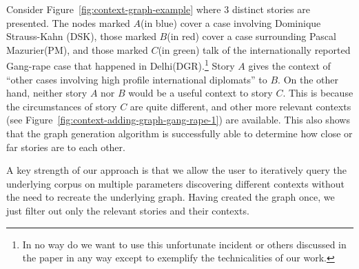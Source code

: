 Consider Figure~\ref{fig:context-graph-example} where 3 distinct stories are presented. The nodes marked $A$(in blue) cover a case involving Dominique Strauss-Kahn (DSK), 
those marked $B$(in red) cover a case surrounding Pascal Mazurier(PM), and those marked $C$(in green) talk of the internationally reported Gang-rape case
that happened in Delhi(DGR).\footnote{In no way do we want to use this unfortunate incident or others discussed in the paper in any way except 
to exemplify the technicalities of our work.} Story $A$ gives the context of ``other cases involving high profile international diplomats'' to $B$. 
On the other hand, neither story $A$ nor $B$ would be a useful context to story $C$. This is because the circumstances of story $C$ are quite different, and
other more relevant contexts (see Figure~\ref{fig:context-adding-graph-gang-rape-1}) are available.
This also shows that the graph generation algorithm is successfully able to determine how close or far stories are to each other.

A key strength of our approach is that we allow the user to iteratively query the underlying corpus on multiple parameters discovering different contexts without the need to recreate the
underlying graph. Having created the graph once, we just filter out only the relevant stories and their contexts.
